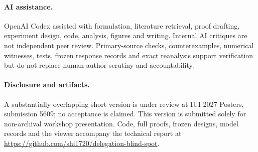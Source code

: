 \documentclass[runningheads]{llncs}
\begin{document}
\paragraph{AI assistance.}
OpenAI Codex assisted with formulation, literature retrieval, proof drafting, experiment design, code, analysis, figures and writing. Internal AI critiques are not independent peer review. Primary-source checks, counterexamples, numerical witnesses, tests, frozen response records and exact reanalysis support verification but do not replace human-author scrutiny and accountability.

\paragraph{Disclosure and artifacts.}
A substantially overlapping short version is under review at IUI 2027 Posters, submission 5609; no acceptance is claimed. This version is submitted solely for non-archival workshop presentation. Code, full proofs, frozen designs, model records and the viewer accompany the technical report at \url{https://github.com/shi1720/delegation-blind-spot}.



\end{document}

